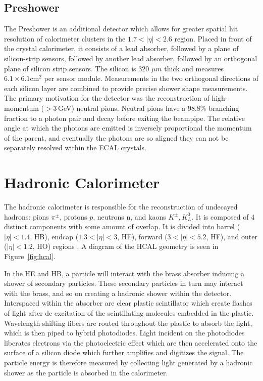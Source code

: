 \subsection{Preshower}

The Preshower is an additional detector which allows for greater spatial hit resolution of calorimeter clusters in the $1.7<|\eta|<2.6$ region. Placed in front of the crystal calorimeter, it consists of a lead absorber, followed by a plane of silicon-strip sensors, followed by another lead absorber, followed by an orthogonal plane of silicon strip sensors. The silicon is 320 $\mu m$ thick and measures $6.1\times6.1 \textrm{cm}^{2}$ per sensor module. Measurements in the two orthogonal directions of each silicon layer are combined to provide precise shower shape measurements. The primary motivation for the detector was the reconstruction of high-momentum ($>3\,$GeV) neutral pions. Neutral pions have a 98.8\% branching fraction to a photon pair and decay before exiting the beampipe. The relative angle at which the photons are emitted is inversely proportional the momentum of the parent, and eventually the photons are so aligned they can not be separately resolved within the ECAL crystals.

\section{Hadronic Calorimeter}

The hadronic calorimeter is responsible for the reconstruction of undecayed hadrons: pions $\pi^{\pm}$, protons $p$, neutrons n, and kaons $K^{\pm}, K^{0}_{L}$. It is composed of 4 distinct components with some amount of overlap. It is divided into barrel ($|\eta|<1.4$, HB), endcap ($1.3<|\eta|<3$, HE), forward ($3<|\eta|<5.2$, HF), and outer ($|\eta|<1.2$, HO) regions  \cite{hcaltdr}. A diagram of the HCAL geometry is seen in Figure~\ref{fig:hcal}.

In the HE and HB, a particle will interact with the brass absorber inducing a shower of secondary particles. These secondary particles in turn may interact with the brass, and so on creating a hadronic shower within the detector. Interspaced within the absorber are clear plastic scintillator which create flashes of light after de-excitation of the scintillating molecules embedded in the plastic. Wavelength shifting fibers are routed throughout the plastic to absorb the light, which is then piped to hybrid photodiodes. Light incident on the photodiodes liberates electrons via the photoelectric effect which are then accelerated onto the surface of a silicon diode which further amplifies and digitizes the signal. The particle energy is therefore measured by collecting light generated by a hadronic shower as the particle is absorbed in the calorimeter.

